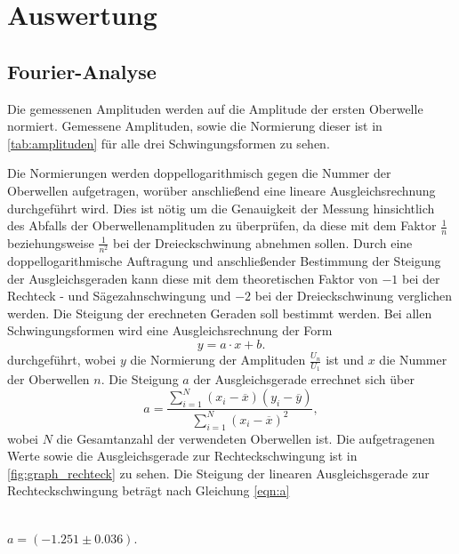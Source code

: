 \section{Auswertung}
\label{sec:Auswertung}

\subsection{Fourier-Analyse}
Die gemessenen Amplituden werden auf die Amplitude der ersten Oberwelle normiert. Gemessene Amplituden, sowie die Normierung 
dieser ist in \autoref{tab:amplituden} für alle drei Schwingungsformen zu sehen.

Die Normierungen werden doppellogarithmisch gegen die Nummer der Oberwellen aufgetragen, worüber anschließend eine lineare
Ausgleichsrechnung durchgeführt wird. Dies ist nötig um die Genauigkeit der Messung hinsichtlich des Abfalls der Oberwellenamplituden
zu überprüfen, da diese mit dem Faktor $\frac{1}{n}$ beziehungsweise $\frac{1}{n^2}$ bei der Dreieckschwinung abnehmen sollen.
Durch eine doppellogarithmische Auftragung und anschließender Bestimmung der Steigung der Ausgleichsgeraden kann diese mit dem 
theoretischen Faktor von $-1$ bei der Rechteck - und Sägezahnschwingung und $-2$ bei der Dreieckschwinung verglichen werden. 
Die Steigung der erechneten Geraden soll bestimmt werden. Bei allen Schwingungsformen wird eine Ausgleichsrechnung der Form 
\begin{equation}
y = a \cdot x + b.
\end{equation} 
durchgeführt, wobei $y$ die Normierung der Amplituden  $\frac{U_n}{U_1}$ ist und  $x$ die Nummer der Oberwellen $n$.
Die Steigung $a$ der Ausgleichsgerade errechnet sich über 
\begin{equation}
\label{eqn:a}
a = \frac {\sum_{i=1}^N (x_i - \overline{x}) (y_i - \overline{y})}{\sum_{i=1}^N (x_i - \overline{x})^2},
\end{equation}
wobei $N$ die Gesamtanzahl der verwendeten Oberwellen ist.
Die aufgetragenen Werte sowie die Ausgleichsgerade zur Rechteckschwingung ist in \autoref{fig:graph_rechteck} zu sehen.
Die Steigung der linearen Ausgleichsgerade zur Rechteckschwingung beträgt nach Gleichung \eqref{eqn:a}
\\ \\
\centerline{$a = ( -1.251 \pm 0.036 ) $.}
\\ \\
